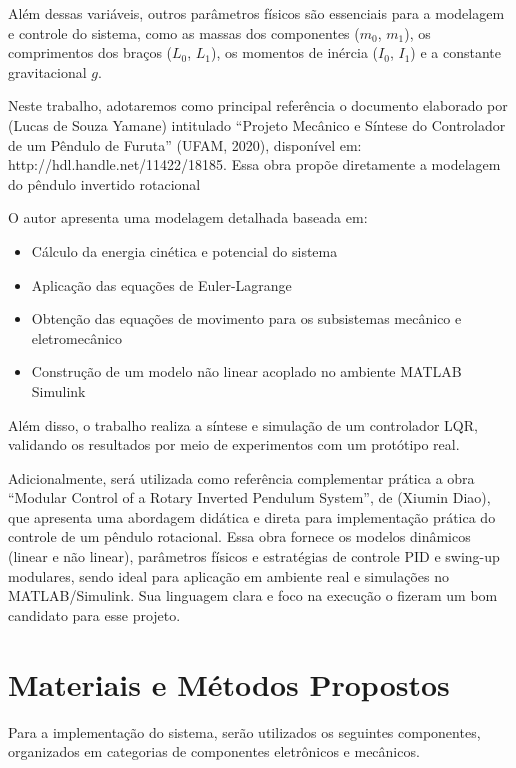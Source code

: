 \documentclass[9pt,a4paper,twocolumn,twoside]{tau-class/tau}
\begin{document}
        Além dessas variáveis, outros parâmetros físicos são essenciais para a modelagem e controle do sistema, como as massas dos componentes ($m_0$, $m_1$), os comprimentos dos braços ($L_0$, $L_1$), os momentos de inércia ($I_0$, $I_1$) e a constante gravitacional $g$.

    Neste trabalho, adotaremos como principal referência o documento elaborado por (Lucas de Souza Yamane) intitulado “Projeto Mecânico e Síntese do Controlador de um Pêndulo de Furuta” (UFAM, 2020), disponível em: http://hdl.handle.net/11422/18185. Essa obra propõe diretamente a modelagem do pêndulo invertido rotacional

    O autor apresenta uma modelagem detalhada baseada em:
    \begin{itemize}

    \item Cálculo da energia cinética e potencial do sistema
    
    \item Aplicação das equações de Euler-Lagrange  
    
    \item Obtenção das equações de movimento para os subsistemas mecânico e eletromecânico
    
    
    \item Construção de um modelo não linear acoplado no ambiente 
    MATLAB Simulink
    \end{itemize}

    Além disso, o trabalho realiza a síntese e simulação de um controlador LQR, validando os resultados por meio de experimentos com um protótipo real.
    
    Adicionalmente, será utilizada como referência complementar prática a obra “Modular Control of a Rotary Inverted Pendulum System”, de (Xiumin Diao), que apresenta uma abordagem didática e direta para implementação prática do controle de um pêndulo rotacional. Essa obra fornece os modelos dinâmicos (linear e não linear), parâmetros físicos e estratégias de controle PID e swing-up modulares, sendo ideal para aplicação em ambiente real e simulações no MATLAB/Simulink. Sua linguagem clara e foco na execução o fizeram um bom candidato para esse projeto.


\section{Materiais e Métodos Propostos}

    Para a implementação do sistema, serão utilizados os seguintes componentes, organizados em categorias de componentes eletrônicos e mecânicos.
\end{document}
